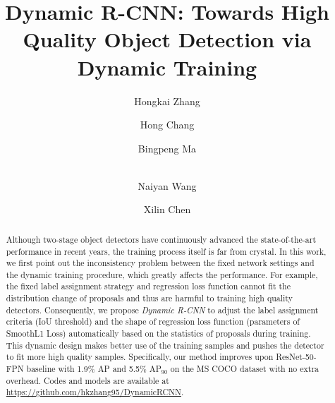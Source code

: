 \documentclass[runningheads]{llncs}
\begin{document}
\pagestyle{headings}
\mainmatter
\def\ECCVSubNumber{2335}  

\title{Dynamic R-CNN: Towards High Quality Object Detection via Dynamic Training} 

\begin{comment}
\titlerunning{ECCV-20 submission ID \ECCVSubNumber}
\authorrunning{ECCV-20 submission ID \ECCVSubNumber}
\author{Anonymous ECCV submission}
\institute{Paper ID \ECCVSubNumber}
\end{comment}


\author{Hongkai Zhang \and
Hong Chang \and
Bingpeng Ma \and\\
Naiyan Wang \and
Xilin Chen}
\maketitle

\begin{abstract}
    Although two-stage object detectors have continuously advanced the state-of-the-art performance in recent years, the training process itself is far from crystal. In this work, we first point out the inconsistency problem between the fixed network settings and the dynamic training procedure, which greatly affects the performance. For example, the fixed label assignment strategy and regression loss function cannot fit the distribution change of proposals and thus are harmful to training high quality detectors.
    Consequently, we propose \emph{Dynamic R-CNN} to adjust the label assignment criteria (IoU threshold) and the shape of regression loss function (parameters of SmoothL1 Loss) automatically based on the statistics of proposals during training. This dynamic design makes better use of the training samples and pushes the detector to fit more high quality samples. Specifically, our method improves upon ResNet-50-FPN baseline with 1.9\% AP and 5.5\% AP$_{90}$ on the MS COCO dataset with no extra overhead. Codes and models are available at \url{https://github.com/hkzhang95/DynamicRCNN}.
\end{abstract}
\end{document}

